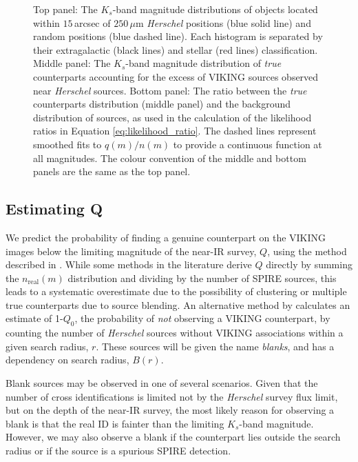 \begin{figure}
	\caption[$K_s$-band distribution of counterparts, separated into galaxies and stars]{Top panel: The $K_s$-band magnitude distributions of objects located within $15\,$arcsec of $250\,\mu$m \textit{Herschel} positions (blue solid line) and random positions (blue dashed line). Each histogram is separated by their extragalactic (black lines) and stellar (red lines) classification. Middle panel: The $K_s$-band magnitude distribution of \textit{true} counterparts accounting for the excess of VIKING sources observed near \textit{Herschel} sources. Bottom panel: The ratio between the \textit{true} counterparts distribution (middle panel) and the background distribution of sources, as used in the calculation of the likelihood ratios in Equation \ref{eq:likelihood_ratio}. The dashed lines represent smoothed fits to $q(m)/n(m)$ to provide a continuous function at all magnitudes. The colour convention of the middle and bottom panels are the same as the top panel.}
	\label{fig:true_counterparts_distribution}
\end{figure}

\subsection{Estimating Q}
\label{sec:estimating_Q}

We predict the probability of finding a genuine counterpart on the VIKING images below the limiting magnitude of the near-IR survey, $Q$, using the method described in \citealt{Fleuren_2012}. While some methods in the literature derive $Q$ directly by summing the $n_{\textrm{real}}(m)$ distribution and dividing by the number of SPIRE sources, this leads to a systematic overestimate due to the possibility of clustering or multiple true counterparts due to source blending. An alternative method by \citealt{Fleuren_2012} calculates an estimate of 1-$Q_0$, the probability of \textit{not} observing a VIKING counterpart, by counting the number of \textit{Herschel} sources without VIKING associations within a given search radius, $r$. These sources will be given the name \textit{blanks}, and has a dependency on search radius, $B(r)$.

Blank sources may be observed in one of several scenarios. Given that the number of cross identifications is limited not by the \textit{Herschel} survey flux limit, but on the depth of the near-IR survey, the most likely reason for observing a blank is that the real ID is fainter than the limiting $K_s$-band magnitude. However, we may also observe a blank if the counterpart lies outside the search radius or if the source is a spurious SPIRE detection.

